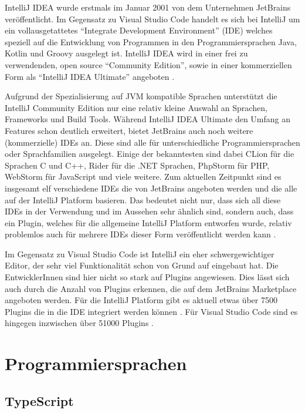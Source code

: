 IntelliJ IDEA wurde erstmals im Januar 2001 \cite{IntelliJIDEAWikipedia,IntelliJReleasePage}
von dem Unternehmen 
JetBrains veröffentlicht. Im Gegensatz zu Visual Studio Code handelt 
es sich bei IntelliJ um ein vollausgetattetes
\enquote{Integrate Development Environment}
(IDE) welches speziell auf die Entwicklung 
von Programmen in den Programmiersprachen Java, Kotlin und Groovy ausgelegt ist. 
IntelliJ IDEA wird in einer frei zu verwendenden, open source 
\enquote{Community Edition}, sowie in einer kommerziellen Form als 
\enquote{IntelliJ IDEA Ultimate} angeboten \cite{HagosTed2022BII:}. 

Aufgrund der Spezialisierung auf JVM kompatible Sprachen unterstützt 
die IntelliJ Community Edition nur eine relativ kleine Auswahl an 
Sprachen, Frameworks und Build Tools. Während IntelliJ IDEA Ultimate 
den Umfang an Features schon deutlich erweitert, bietet JetBrains auch 
noch weitere (kommerzielle) IDEs an. Diese sind alle für unterschiedliche 
Programmiersprachen oder Sprachfamilien ausgelegt. Einige der bekanntesten 
sind dabei CLion für die Sprachen C und C++, Rider für die .NET Sprachen, 
PhpStorm für PHP, WebStorm für JavaScript und viele weitere. Zum aktuellen 
Zeitpunkt sind es insgesamt elf verschiedene IDEs die von JetBrains 
angeboten werden und die alle auf der IntelliJ Platform basieren. Das 
bedeutet nicht nur, dass sich all diese IDEs in der Verwendung und im 
Aussehen sehr ähnlich sind, sondern auch, dass ein Plugin, welches für 
die allgemeine IntelliJ Platform entworfen wurde, relativ problemlos 
auch für mehrere IDEs dieser Form veröffentlicht werden kann \cite{IntelliJSDKDocumentation}.

Im Gegensatz zu Visual Studio Code ist IntelliJ ein eher schwergewichtiger
Editor, der sehr viel Funktionalität schon von Grund auf eingebaut 
hat. Die EntwicklerInnen sind hier nicht so stark auf Plugins angewiesen.
Dies lässt sich auch durch die Anzahl von Plugins erkennen, die auf dem 
JetBrains Marketplace angeboten werden. Für die IntelliJ Platform gibt 
es aktuell etwas über 7500 Plugins die in die IDE integriert werden können 
\cite{IntelliJMarketplace}.
Für Visual Studio Code sind es hingegen inzwischen über 51000 Plugins
\cite{VSCodeMarketplace}.


\section{Programmiersprachen}
\label{sec:Programmiersprachen}

\subsection{TypeScript}

